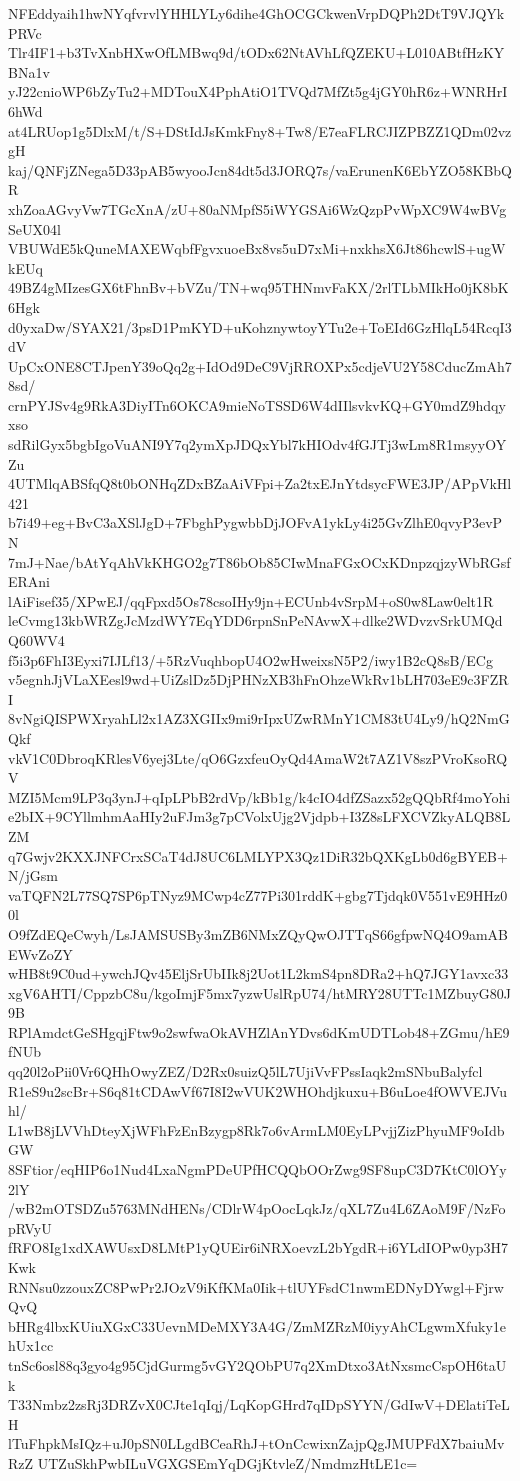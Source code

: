 NFEddyaih1hwNYqfvrvlYHHLYLy6dihe4GhOCGCkwenVrpDQPh2DtT9VJQYkPRVc
Tlr4IF1+b3TvXnbHXwOfLMBwq9d/tODx62NtAVhLfQZEKU+L010ABtfHzKYBNa1v
yJ22cnioWP6bZyTu2+MDTouX4PphAtiO1TVQd7MfZt5g4jGY0hR6z+WNRHrI6hWd
at4LRUop1g5DlxM/t/S+DStIdJsKmkFny8+Tw8/E7eaFLRCJIZPBZZ1QDm02vzgH
kaj/QNFjZNega5D33pAB5wyooJcn84dt5d3JORQ7s/vaErunenK6EbYZO58KBbQR
xhZoaAGvyVw7TGcXnA/zU+80aNMpfS5iWYGSAi6WzQzpPvWpXC9W4wBVgSeUX04l
VBUWdE5kQuneMAXEWqbfFgvxuoeBx8vs5uD7xMi+nxkhsX6Jt86hcwlS+ugWkEUq
49BZ4gMIzesGX6tFhnBv+bVZu/TN+wq95THNmvFaKX/2rlTLbMIkHo0jK8bK6Hgk
d0yxaDw/SYAX21/3psD1PmKYD+uKohznywtoyYTu2e+ToEId6GzHlqL54RcqI3dV
UpCxONE8CTJpenY39oQq2g+IdOd9DeC9VjRROXPx5cdjeVU2Y58CducZmAh78sd/
crnPYJSv4g9RkA3DiyITn6OKCA9mieNoTSSD6W4dIIlsvkvKQ+GY0mdZ9hdqyxso
sdRilGyx5bgbIgoVuANI9Y7q2ymXpJDQxYbl7kHIOdv4fGJTj3wLm8R1msyyOYZu
4UTMlqABSfqQ8t0bONHqZDxBZaAiVFpi+Za2txEJnYtdsycFWE3JP/APpVkHl421
b7i49+eg+BvC3aXSlJgD+7FbghPygwbbDjJOFvA1ykLy4i25GvZlhE0qvyP3evPN
7mJ+Nae/bAtYqAhVkKHGO2g7T86bOb85CIwMnaFGxOCxKDnpzqjzyWbRGsfERAni
lAiFisef35/XPwEJ/qqFpxd5Os78csoIHy9jn+ECUnb4vSrpM+oS0w8Law0elt1R
leCvmg13kbWRZgJcMzdWY7EqYDD6rpnSnPeNAvwX+dlke2WDvzvSrkUMQdQ60WV4
f5i3p6FhI3Eyxi7IJLf13/+5RzVuqhbopU4O2wHweixsN5P2/iwy1B2cQ8sB/ECg
v5egnhJjVLaXEesl9wd+UiZslDz5DjPHNzXB3hFnOhzeWkRv1bLH703eE9c3FZRI
8vNgiQISPWXryahLl2x1AZ3XGIIx9mi9rIpxUZwRMnY1CM83tU4Ly9/hQ2NmGQkf
vkV1C0DbroqKRlesV6yej3Lte/qO6GzxfeuOyQd4AmaW2t7AZ1V8szPVroKsoRQV
MZI5Mcm9LP3q3ynJ+qIpLPbB2rdVp/kBb1g/k4cIO4dfZSazx52gQQbRf4moYohi
e2bIX+9CYllmhmAaHIy2uFJm3g7pCVolxUjg2Vjdpb+I3Z8sLFXCVZkyALQB8LZM
q7Gwjv2KXXJNFCrxSCaT4dJ8UC6LMLYPX3Qz1DiR32bQXKgLb0d6gBYEB+N/jGsm
vaTQFN2L77SQ7SP6pTNyz9MCwp4cZ77Pi301rddK+gbg7Tjdqk0V551vE9HHz00l
O9fZdEQeCwyh/LsJAMSUSBy3mZB6NMxZQyQwOJTTqS66gfpwNQ4O9amABEWvZoZY
wHB8t9C0ud+ywchJQv45EljSrUbIIk8j2Uot1L2kmS4pn8DRa2+hQ7JGY1avxc33
xgV6AHTI/CppzbC8u/kgoImjF5mx7yzwUslRpU74/htMRY28UTTc1MZbuyG80J9B
RPlAmdctGeSHgqjFtw9o2swfwaOkAVHZlAnYDvs6dKmUDTLob48+ZGmu/hE9fNUb
qq20l2oPii0Vr6QHhOwyZEZ/D2Rx0suizQ5lL7UjiVvFPssIaqk2mSNbuBalyfcl
R1eS9u2scBr+S6q81tCDAwVf67I8I2wVUK2WHOhdjkuxu+B6uLoe4fOWVEJVuhl/
L1wB8jLVVhDteyXjWFhFzEnBzygp8Rk7o6vArmLM0EyLPvjjZizPhyuMF9oIdbGW
8SFtior/eqHIP6o1Nud4LxaNgmPDeUPfHCQQbOOrZwg9SF8upC3D7KtC0lOYy2lY
/wB2mOTSDZu5763MNdHENs/CDlrW4pOocLqkJz/qXL7Zu4L6ZAoM9F/NzFopRVyU
fRFO8Ig1xdXAWUsxD8LMtP1yQUEir6iNRXoevzL2bYgdR+i6YLdIOPw0yp3H7Kwk
RNNsu0zzouxZC8PwPr2JOzV9iKfKMa0Iik+tlUYFsdC1nwmEDNyDYwgl+FjrwQvQ
bHRg4lbxKUiuXGxC33UevnMDeMXY3A4G/ZmMZRzM0iyyAhCLgwmXfuky1ehUx1cc
tnSc6osl88q3gyo4g95CjdGurmg5vGY2QObPU7q2XmDtxo3AtNxsmcCspOH6taUk
T33Nmbz2zsRj3DRZvX0CJte1qIqj/LqKopGHrd7qIDpSYYN/GdIwV+DElatiTeLH
lTuFhpkMsIQz+uJ0pSN0LLgdBCeaRhJ+tOnCcwixnZajpQgJMUPFdX7baiuMvRzZ
UTZuSkhPwbILuVGXGSEmYqDGjKtvleZ/NmdmzHtLE1c=
